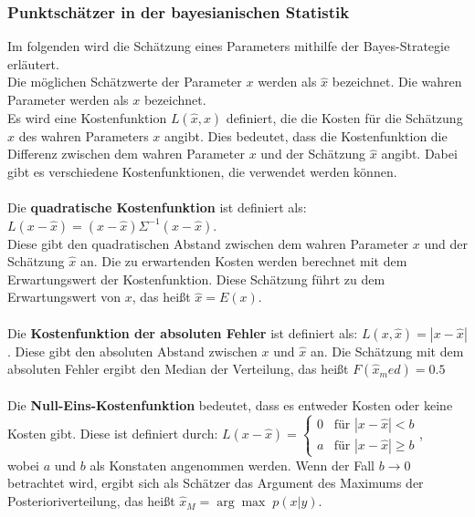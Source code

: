 \documentclass[a4paper,12pt]{article}
\begin{document}
\subsubsection{Punktschätzer in der bayesianischen Statistik}
Im folgenden wird die Schätzung eines Parameters mithilfe der Bayes-Strategie erläutert. \\
Die möglichen Schätzwerte der Parameter $x$ werden als $\hat{x}$ bezeichnet. Die wahren Parameter werden als $x$ bezeichnet. \\
Es wird eine Kostenfunktion $L(\hat{x},x)$ definiert, die die Kosten für die Schätzung $\hat{x}$ des wahren Parameters $x$ angibt.
Dies bedeutet, dass die Kostenfunktion die Differenz zwischen dem wahren Parameter $x$ und der Schätzung $\hat{x}$ angibt.
Dabei gibt es verschiedene Kostenfunktionen, die verwendet werden können. \parencite[65]{EinfBayesStatistik} \\\\
Die \textbf{quadratische Kostenfunktion} ist definiert als: $L(x-\hat{x}) = (x-\hat{x})\Sigma^{-1}(x-\hat{x})$. \\
Diese gibt den quadratischen Abstand zwischen dem wahren Parameter $x$ und der Schätzung $\hat{x}$ an.
Die zu erwartenden Kosten werden berechnet mit dem Erwartungswert der Kostenfunktion.
Diese Schätzung führt zu dem Erwartungswert von $x$, das heißt $\hat{x} = E(x)$. \parencite[65-66]{EinfBayesStatistik} \\\\
Die \textbf{Kostenfunktion der absoluten Fehler} ist definiert als: $L(x,\hat{x}) = |x-\hat{x}|$.
Diese gibt den absoluten Abstand zwischen $x$ und $\hat{x}$ an.
Die Schätzung mit dem absoluten Fehler ergibt den Median der Verteilung, das heißt $F(\hat{x}_med) = 0.5$ \parencite[67-68]{EinfBayesStatistik} \\\\
Die \textbf{Null-Eins-Kostenfunktion} bedeutet, dass es entweder Kosten oder keine Kosten gibt.
Diese ist definiert durch: $L(x-\hat{x}) = 
\begin{cases}
  0 & \text{für } |x-\hat{x}| < b \\
  a & \text{für } |x-\hat{x}| \geq b
\end{cases}$,\\
wobei $a$ und $b$ als Konstaten angenommen werden. Wenn der Fall $b \to 0$ betrachtet wird,
ergibt sich als Schätzer das Argument des Maximums der Posterioriverteilung, das heißt $\hat{x}_M = \arg \max \; p(x|y)$. \parencite[68-69]{EinfBayesStatistik}
\end{document}

